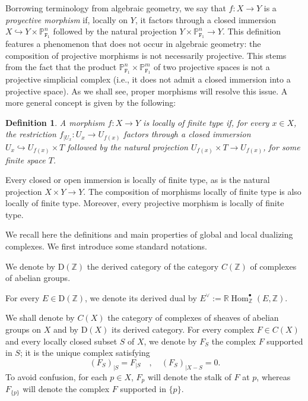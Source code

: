 \documentclass[amssymb,amscd,11pt,20pt]{amsart}
\newcommand{\FF}{{\mathtt F}}
\newcommand{\ZZ}{{\mathbb Z}}
\newcommand{\PP}{\mathbb P}
\newcommand{\RR}{\mathbb R}
\newcommand{\0}{\mathbf 0}
\DeclareMathOperator{\Hom}{{Hom}}
\newcommand{\pun}{{\scriptscriptstyle \bullet}}
\theoremstyle{plain}
\newtheorem{defn}[thm]{Definition}
\numberwithin{equation}{thm}
\begin{document}
Borrowing terminology from algebraic geometry, we say that $f\colon X\to Y$ is a {\em proyective morphism} if, locally on $Y$, it factors through a closed immersion $X\hookrightarrow Y\times\PP^n_{\FF_1}$ followed by the natural projection $Y\times\PP^n_{\FF_1}\to Y$. This definition features a phenomenon that does not occur in algebraic geometry: the composition of projective morphisms is not necessarily projective. This stems from the fact that the product $\PP^n_{\FF_1}\times \PP^m_{\FF_1}$ of two projective spaces is not a projective simplicial complex (i.e., it does not admit  a closed immersion into a projective space). As we shall see, proper morphisms will resolve this issue.
A more general concept is given by  the following:

\begin{defn}{\rm  
A morphism $f\colon X\to Y$ is {\em locally of finite type} if, for every $x\in X$, the restriction $f_{\vert U_x}\colon U_x\to U_{f(x)}$ factors through a closed immersion $U_x\hookrightarrow U_{f(x)}\times T$ followed by  the natural projection $U_{f(x)}\times T \to U_{f(x)}$, for some finite space $T$.}
\end{defn} 

Every closed or open immersion is locally of finite type, as is the natural projection $X\times Y\to Y$. The composition of morphisms locally of finite type is also locally of finite type. Moreover, every projective morphism is locally of finite type.


\bigskip
{} We recall here the definitions and main properties of global and local dualizing complexes. We first introduce some standard notations.

We  denote by $\mathrm {D}(\ZZ)$ the derived category of the category $C(\ZZ)$ of complexes of abelian groups. 

For every $E\in \mathrm{D}(\ZZ)$, we denote its derived dual by $E^\vee:=\RR\Hom^\pun_\ZZ(E,\ZZ)$. 





We shall denote by $C(X)$ the category of complexes of sheaves of abelian groups on $X$ and by $\mathrm{D}(X)$ its derived category.  For every complex $F\in C(X)$ and every locally closed subset $S$ of $X$, we  denote by $F_S$ the complex $F$ supported in $S$; it is the unique complex satisfying
\[ (F_S)_{\vert S}=F_{\vert S}\quad , \quad (F_S)_{\vert X-S}=0.\] 
To avoid confusion, for each $p\in X$, $F_p$ will denote  the stalk of $F$ at $p$, whereas $F_{\{p\}}$ will denote the complex $F$ supported in $\{p\}$.
\end{document}
